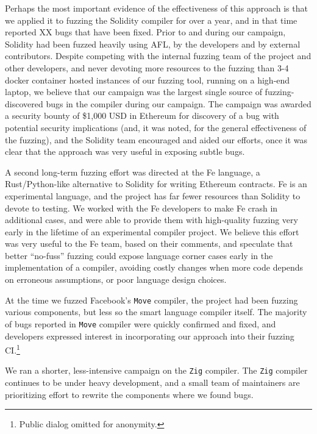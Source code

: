 Perhaps the most important evidence of the effectiveness of this approach is that we applied it to fuzzing the Solidity compiler for over a year, and in that time reported XX bugs that have been fixed.  Prior to and during our campaign, Solidity had been fuzzed heavily using AFL, by the developers and by external contributors.  Despite competing with the internal fuzzing team of the project and other developers, and never devoting more resources to the fuzzing than 3-4 docker container hosted instances of our fuzzing tool, running on a high-end laptop, we believe that our campaign was the largest single source of fuzzing-discovered bugs in the compiler during our campaign.  The campaign was awarded a security bounty of \$1,000 USD in Ethereum for discovery of a bug with potential security implications (and, it was noted, for the general effectiveness of the fuzzing), and the Solidity team encouraged and aided our efforts, once it was clear that the approach was very useful in exposing subtle bugs.

A second long-term fuzzing effort was directed at the Fe language, a Rust/Python-like alternative to Solidity for writing Ethereum contracts.  Fe is an experimental language, and the project has far fewer resources than Solidity to devote to testing.  We worked with the Fe developers to make Fe crash in additional cases, and were able to provide them with high-quality fuzzing very early in the lifetime of an experimental compiler project.  We believe this effort was very useful to the Fe team, based on their comments, and speculate that better ``no-fuss'' fuzzing could expose language corner cases early in the implementation of a compiler, avoiding costly changes when more code depends on erroneous assumptions, or poor language design choices.

At the time we fuzzed Facebook's \texttt{Move} compiler, the project had been fuzzing various components, but less so the smart language compiler itself.
The majority of bugs reported in \texttt{Move} compiler were quickly confirmed and fixed, and developers expressed interest in incorporating our approach into their fuzzing CI.\footnote{Public dialog omitted for anonymity.}  %


We ran a shorter, less-intensive campaign on the \texttt{Zig} compiler.  The
\texttt{Zig} compiler continues to be under heavy development, and a small team
of maintainers are prioritizing effort to rewrite the components where we found
bugs.
